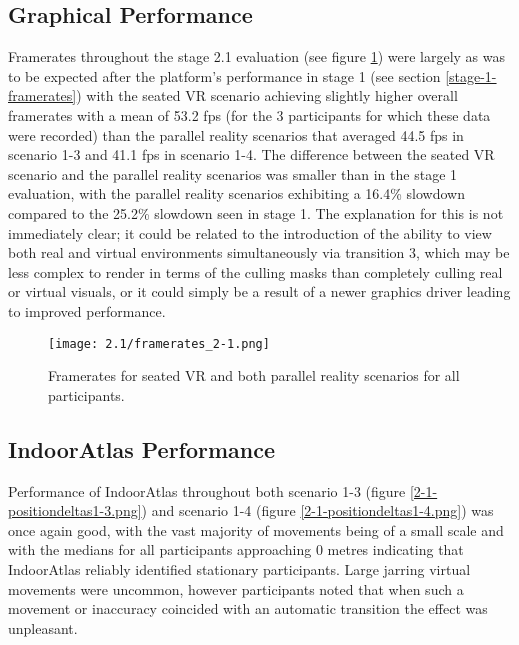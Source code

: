 
\subsection{Graphical Performance}
\label{stage-2-1-framerates}
Framerates throughout the stage 2.1 evaluation (see figure \ref{framerates_2-1.png}) were largely as was to be expected after the platform's performance in stage 1 (see section \ref{stage-1-framerates}) with the seated VR scenario achieving slightly higher overall framerates with a mean of 53.2 fps (for the 3 participants for which these data were recorded) than the parallel reality scenarios that averaged 44.5 fps in scenario 1-3 and 41.1 fps in scenario 1-4. The difference between the seated VR scenario and the parallel reality scenarios was smaller than in the stage 1 evaluation, with the parallel reality scenarios exhibiting a 16.4\% slowdown compared to the 25.2\% slowdown seen in stage 1. The explanation for this is not immediately clear; it could be related to the introduction of the ability to view both real and virtual environments simultaneously via transition 3, which may be less complex to render in terms of the culling masks than completely culling real or virtual visuals, or it could simply be a result of a newer graphics driver leading to improved performance.

\begin{figure}[h]
	\begin{center}
	\texttt{[image: 2.1/framerates\_2-1.png]}
	\caption{Framerates for seated VR and both parallel reality scenarios for all participants.}
	\label{framerates_2-1.png}
	\end{center}
\end{figure}


\subsection{IndoorAtlas Performance}

Performance of IndoorAtlas throughout both scenario 1-3 (figure \ref{2-1-positiondeltas1-3.png}) and scenario 1-4 (figure \ref{2-1-positiondeltas1-4.png}) was once again good, with the vast majority of movements being of a small scale and with the medians for all participants approaching 0 metres indicating that IndoorAtlas reliably identified stationary participants. Large jarring virtual movements were uncommon, however participants noted that when such a movement or inaccuracy coincided with an automatic transition the effect was unpleasant.

